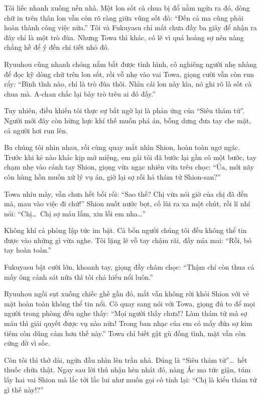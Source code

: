 \documentclass[../main.tex]{subfiles}
\begin{document}

Tôi liếc nhanh xuống nền nhà. Một lon sốt cà chua bị đổ nằm ngửa ra đó, dòng chữ in trên thân lon vẫn còn rõ ràng giữa vũng sốt đỏ: ``Đến cả ma cũng phải hoàn thành công việc nữa.'' Tôi và Fukuyasu chỉ mất chưa đầy ba giây để nhận ra đây chỉ là một trò đùa. Nhưng Towa thì khác, có lẽ vì quá hoảng sợ nên nàng chẳng hề để ý đến chi tiết nhỏ đó.

Ryuuhou cũng nhanh chóng nắm bắt được tình hình, cô nghiêng người nhẹ nhàng để đọc kỹ dòng chữ trên lon sốt, rồi vỗ nhẹ vào vai Towa, giọng cười vẫn còn run rẩy: ``Bình tĩnh nào, chỉ là trò đùa thôi. Nhìn cái lon này kìa, nó ghi rõ là sốt cà chua mà. A-chan chắc lại bày trò trêu ai đó đấy.''

Tuy nhiên, điều khiến tôi thực sự bất ngờ lại là phản ứng của ``Siêu thám tử''. Người mới đây còn hừng hực khí thế muốn phá án, bỗng dưng đưa tay che mặt, cả người hơi run lên.

Ba chúng tôi nhìn nhau, rồi cùng quay mắt nhìn Shion, hoàn toàn ngơ ngác. Trước khi kẻ nào khác kịp mở miệng, em gái tôi đã bước lại gần cô một bước, tay chạm nhẹ vào cánh tay Shion, giọng vừa ngạc nhiên vừa trêu chọc: ``Ủa, mới nãy còn hùng hồn muốn xử lý vụ án, giờ lại sợ rồi hả thám tử Shion-san?''


Towa nhíu mày, vẫn chưa hết bối rối: ``Sao thế? Chị vừa nói giờ của chị đã đến mà, mau vào việc đi chứ!'' Shion nuốt nước bọt, cố lùi ra xa một chút, rồi lí nhí nói: ``Chị\dots\ Chị sợ máu lắm, xin lỗi em nha\dots''

Không khí cả phòng lập tức im bặt. Cả bốn người chúng tôi đều không thể tin được vào những gì vừa nghe. Tôi lặng lẽ vỗ tay chậm rãi, đầy mỉa mai: ``Rồi, bó tay hoàn toàn.''

Fukuyasu bật cười lớn, khoanh tay, giọng đầy châm chọc: ``Thậm chí còn thua cả mấy ông cảnh sát nữa thì tôi chả hiểu nổi luôn.''

Ryuuhou ngồi sụt xuống chiếc ghế gần đó, mắt vẫn không rời khỏi Shion với vẻ mặt hoàn toàn không thể tin nổi. Cô quay sang nói với Towa, giọng đủ to để mọi người trong phòng đều nghe thấy: ``Mọi người thấy chưa!? Làm thám tử mà sợ máu thì giải quyết được vụ nào nữa! Trong ban nhạc của em có mấy đứa sợ kim tiêm còn dũng cảm hơn thế này.'' Towa chỉ biết gật gù đồng tình, mặt vẫn còn cứng đờ vì sốc.

Còn tôi thì thở dài, ngửa đầu nhìn lên trần nhà. Đúng là ``Siêu thám tử''\dots\ hết thuốc chữa thật. Ngay sau lời thú nhận hèn nhát đó, nàng Ác ma tức giận, túm lấy hai vai Shion mà lắc tới lắc lui như muốn gọi cô tỉnh lại: ``Chị là kiểu thám tử gì thế này!?''
\end{document}
